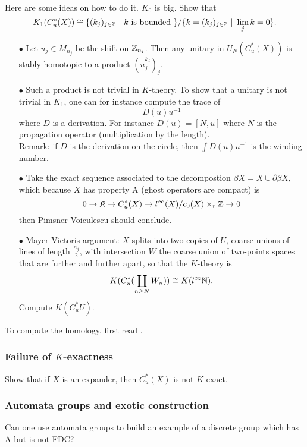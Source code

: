 Here are some ideas on how to do it. $K_0$ is big. Show that 
\[K_1(C^*_u(X)) \cong \{ (k_j)_{j\in \Z} \ |\ k \text{ is bounded } \} /  \{ k=(k_j)_{j\in \Z} \ |\ \lim_j k =0 \}.\]
\begin{itemize}
\item[$\bullet$] Let $u_j\in M_{n_j}$ be the shift on $\mathbb Z_{n_i}$. Then any unitary in $U_N(C^*_u(X))$ is stably homotopic to a product $(u_j^{k_j})_j$.
\item[$\bullet$] Such a product is not trivial in $K$-theory. To show that a unitary is not trivial in $K_1$, one can for instance compute the trace of 
\[D(u)u^{-1}\]
where $D$ is a derivation. For instance $D(u)= [N,u]$ where $N$ is the propagation operator (multiplication by the length).\\
Remark: if $D$ is the derivation on the circle, then $\int D(u)u^{-1}$ is the winding number.  
\item[$\bullet$] Take the exact sequence associated to the decompostion $\beta X = X \cup \partial \beta X$, which because $X$ has property A (ghost operators are compact) is
\[0\rightarrow \mathfrak K \rightarrow C_u^*(X) \rightarrow l^{\infty}(X)/c_{0}(X) \rtimes_r \mathbb Z \rightarrow 0\]
then Pimsner-Voiculescu should conclude. 
\item[$\bullet$] Mayer-Vietoris argument: $X$ splits into two copies of $U$, coarse unions of lines of length $\frac{n_j}{2}$, with intersection $W$ the coarse union of two-points spaces that are further and further apart, so that the $K$-theory is 
\[K(C^*_u(\coprod_{n\geq N} W_n)) \cong K(l^\infty \mathbb N).\]
Compute $K(C_u^*U)$.
\end{itemize} 

To compute the homology, first read \cite{MatuiSurvey}.

\subsubsection*{Failure of $K$-exactness}

Show that if $X$ is an expander, then $C^*_u(X)$ is not $K$-exact.

\subsubsection*{Automata groups and exotic construction}

Can one use automata groups to build an example of a discrete group which has A but is not FDC?\\

